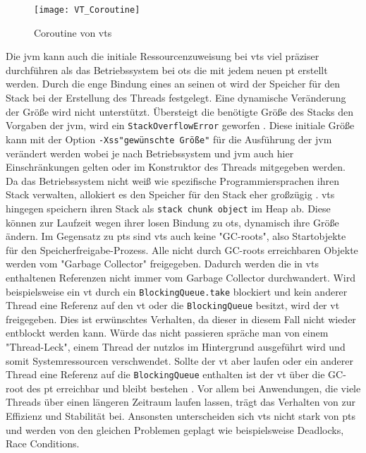     \begin{figure}[H]
        \centering
        \texttt{[image: VT\_Coroutine]}
        \caption{Coroutine von \Glspl{vt}}
        \label{fig:VT_Coroutine}
    \end{figure}

    Die \gls{jvm} kann auch die initiale Ressourcenzuweisung bei \Glspl{vt} viel präziser durchführen als das Betriebssystem bei \Glspl{ot} die mit jedem neuen \gls{pt}
    erstellt werden. Durch die enge Bindung eines  an seinen \gls{ot} wird der Speicher für den Stack bei der Erstellung des Threads festgelegt.
    Eine dynamische Veränderung der Größe wird nicht unterstützt. Übersteigt die benötigte Größe des Stacks den Vorgaben der \gls{jvm}, wird ein \texttt{StackOverflowError}
    geworfen \cite{jvmSpecification}. Diese initiale Größe kann mit der Option \texttt{-Xss"gewünschte Größe"} für die Ausführung der \gls{jvm} verändert werden wobei 
    je nach Betriebssystem und \gls{jvm} auch hier Einschränkungen gelten oder im Konstruktor des Threads mitgegeben werden.
    Da das Betriebssystem nicht weiß wie spezifische Programmiersprachen ihren Stack verwalten, allokiert
    es den Speicher für den Stack eher großzügig \cite{ProjectLoom}.
    \Glspl{vt} hingegen speichern ihren Stack als \texttt{stack chunk object} im Heap ab. Diese können zur Laufzeit wegen ihrer losen Bindung zu \Glspl{ot},
    dynamisch ihre Größe ändern. 
    Im Gegensatz zu \Glspl{pt} sind \Glspl{vt} auch keine "GC-roots", also Startobjekte für den Speicherfreigabe-Prozess. Alle nicht durch GC-roots erreichbaren
    Objekte werden vom "Garbage Collector" freigegeben. Dadurch werden die in \Glspl{vt} enthaltenen
    Referenzen nicht immer vom Garbage Collector durchwandert. Wird beispielsweise ein \gls{vt} durch ein \texttt{BlockingQueue.take} blockiert und kein anderer Thread eine
    Referenz auf den \gls{vt} oder die \texttt{BlockingQueue} besitzt, wird der \gls{vt} freigegeben. Dies ist erwünschtes Verhalten, da dieser in diesem Fall 
    nicht wieder entblockt werden kann. Würde das nicht passieren spräche man von einem "Thread-Leck", einem Thread der nutzlos im Hintergrund ausgeführt wird und somit
    Systemressourcen verschwendet. 
    Sollte der \gls{vt} aber laufen oder ein anderer Thread eine Referenz auf die \texttt{BlockingQueue} enthalten ist der 
    \gls{vt} über die GC-root des \gls{pt} erreichbar und bleibt bestehen \cite{JEP425}.
    Vor allem bei Anwendungen, die viele Threads über einen längeren Zeitraum  laufen lassen, trägt das Verhalten von  zur Effizienz und Stabilität bei.
    Ansonsten unterscheiden sich \Glspl{vt} nicht stark von \Glspl{pt} und werden von den gleichen Problemen geplagt wie beispielsweise Deadlocks, Race Conditions\cite{JEP425}.

